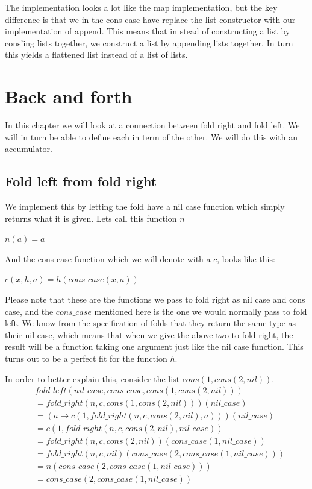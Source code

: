 \documentclass[a4paper]{article}
\begin{document}
The implementation looks a lot like the map implementation, but the key
difference is that we in the cons case have replace the list constructor with
our implementation of append. This means that in stead of constructing a list by
cons'ing lists together, we construct a list by appending lists together. In
turn this yields a flattened list instead of a list of lists.

\section{Back and forth}
In this chapter we will look at a connection between fold right and fold left.
We will in turn be able to define each in term of the other. We will do this
with an accumulator.

\subsection{Fold left from fold right}
We implement this by letting the fold have a nil case function which simply
returns what it is given. Lets call this function $n$

\begin{center}
  $n(a) = a$
\end{center}

And the cons case function which we will denote with a $c$, looks like this:

\begin{center}
  $c(x, h, a) = h (cons\_case(x, a))$
\end{center}

Please note that these are the functions we pass to fold right as nil case and
cons case, and the $cons\_case$ mentioned here is the one we would normally pass
to fold left. We know from the specification of folds that they return the same
type as their nil case, which means that when we give the above two to fold
right, the result will be a function taking one argument just like the nil case
function. This turns out to be a perfect fit for the function $h$.

In order to better explain this, consider the list $cons(1,cons(2, nil))$. 
\begin{align*}
        &fold\_left(nil\_case, cons\_case, cons(1,cons(2, nil))) 
  \\ &= fold\_right(n, c, cons(1,cons(2, nil)))(nil\_case)
  \\ &= (a \rightarrow c(1, fold\_right(n, c, cons(2,nil), a)))(nil\_case)
  \\ &= c(1, fold\_right(n, c, cons(2,nil), nil\_case))
  \\ &= fold\_right(n, c, cons(2,nil))(cons\_case(1,nil\_case))
  \\ &= fold\_right(n, c, nil)(cons\_case(2,cons\_case(1,nil\_case)))
  \\ &= n(cons\_case(2,cons\_case(1,nil\_case)))
  \\ &= cons\_case(2,cons\_case(1,nil\_case))
\end{align*}
\end{document}
